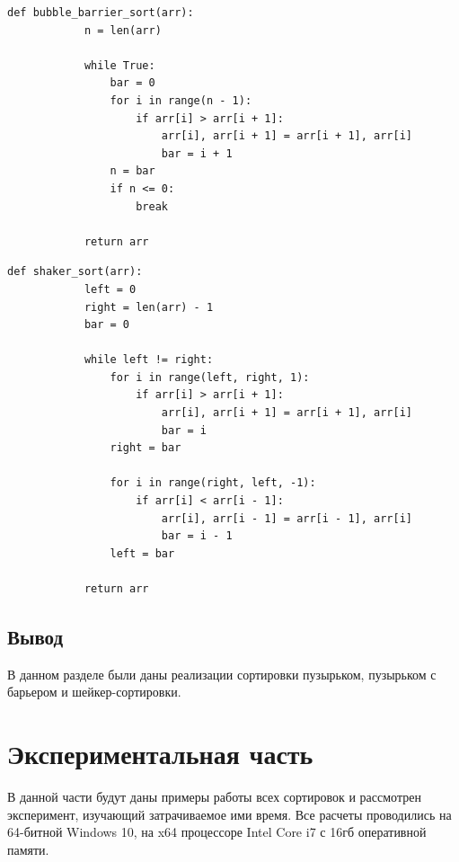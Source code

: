 \documentclass[a4paper, 14pt]{article}
\begin{document}
		\begin{lstlisting}[label=some-code,caption=Алгоритм сортировки пузырьком с барьером]
		def bubble_barrier_sort(arr):
    		n = len(arr)

    		while True:
        		bar = 0
        		for i in range(n - 1):
            		if arr[i] > arr[i + 1]:
                		arr[i], arr[i + 1] = arr[i + 1], arr[i]
                		bar = i + 1
        		n = bar
        		if n <= 0:
            		break

    		return arr
		\end{lstlisting} 
		\begin{lstlisting}[label=some-code,caption=Алгоритм шейкер-сортировки]
		def shaker_sort(arr):
    		left = 0
    		right = len(arr) - 1
    		bar = 0

    		while left != right:
        		for i in range(left, right, 1):
            		if arr[i] > arr[i + 1]:
                		arr[i], arr[i + 1] = arr[i + 1], arr[i]
                		bar = i
        		right = bar

        		for i in range(right, left, -1):
            		if arr[i] < arr[i - 1]:
                		arr[i], arr[i - 1] = arr[i - 1], arr[i]
                		bar = i - 1
        		left = bar

    		return arr
		\end{lstlisting} 
        
   \subsection{Вывод}
   В данном разделе были даны реализации сортировки пузырьком, пузырьком с барьером и шейкер-сортировки.
   

       	\newpage
       	
        \section{Экспериментальная часть}
        В данной части будут даны примеры работы всех сортировок и рассмотрен эксперимент, изучающий затрачиваемое ими время. Все расчеты проводились на 64-битной Windows 10, на x64 процессоре Intel Core i7 с 16гб оперативной памяти.
\end{document}
